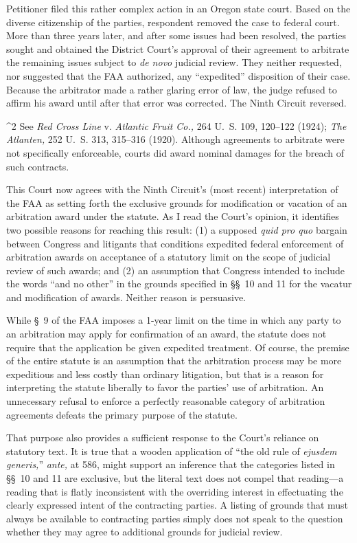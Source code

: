   Petitioner filed this rather complex action in an Oregon state court.
Based on the diverse citizenship of the parties, respondent removed
the case to federal court. More than three years later, and after some
issues had been resolved, \newpage  the parties sought and obtained
the District Court's approval of their agreement to arbitrate the
remaining issues subject to \emph{de novo} judicial review. They neither
requested, nor suggested that the FAA authorized, any ``expedited''
disposition of their case. Because the arbitrator made a rather glaring
error of law, the judge refused to affirm his award until after that
error was corrected. The Ninth Circuit reversed.


^2 See \emph{Red Cross Line} v. \emph{Atlantic Fruit Co.,} 264 U.~S. 109,
120--122 (1924); \emph{The Atlanten,} 252 U.~S. 313, 315--316 (1920).
Although agreements to arbitrate were not specifically enforceable,
courts did award nominal damages for the breach of such contracts.


  This Court now agrees with the Ninth Circuit's (most recent)
interpretation of the FAA as setting forth the exclusive grounds for
modification or vacation of an arbitration award under the statute.
As I read the Court's opinion, it identifies two possible reasons
for reaching this result: (1) a supposed \emph{quid pro quo} bargain
between Congress and litigants that conditions expedited federal
enforcement of arbitration awards on acceptance of a statutory limit on
the scope of judicial review of such awards; and (2) an assumption that
Congress intended to include the words ``and no other'' in the grounds
specified in \S\S~10 and 11 for the vacatur and modification of awards.
Neither reason is persuasive.

  While \S~9 of the FAA imposes a 1-year limit on the time in which
any party to an arbitration may apply for confirmation of an award,
the statute does not require that the application be given expedited
treatment. Of course, the premise of the entire statute is an assumption
that the arbitration process may be more expeditious and less costly
than ordinary litigation, but that is a reason for interpreting the
statute liberally to favor the parties' use of arbitration. An
unnecessary refusal to enforce a perfectly reasonable category of
arbitration agreements defeats the primary purpose of the statute.

  That purpose also provides a sufficient response to the Court's
reliance on statutory text. It is true that a wooden application of
``the old rule of \emph{ejusdem generis,}'' \emph{ante,} at 586, might
support an inference that the categories listed in \S\S~10 and 11 are
exclusive, but the literal text does not compel that reading---a reading
that is flatly inconsistent with the \newpage  overriding interest in
effectuating the clearly expressed intent of the contracting parties.
A listing of grounds that must always be available to contracting
parties simply does not speak to the question whether they may agree to
additional grounds for judicial review.

